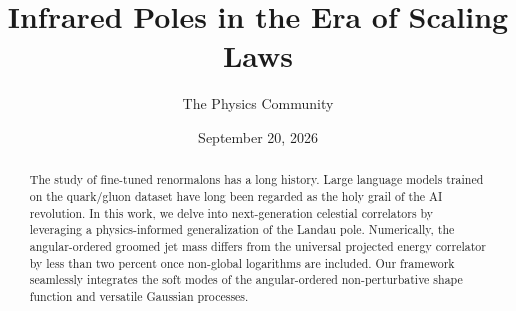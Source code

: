 \documentclass[11pt]{article}
\title{Infrared Poles in the Era of Scaling Laws}
\author{The Physics Community}
\date{September 20, 2026}
\numberwithin{equation}{section}
\theoremstyle{definition}
\theoremstyle{remark}
\begin{document}
\maketitle
\begin{abstract}
The study of fine-tuned renormalons has a long history. Large language
models trained on the quark/gluon dataset have long been regarded as the
holy grail of the AI revolution. In this work, we delve into
next-generation celestial correlators by leveraging a physics-informed
generalization of the Landau pole. Numerically, the angular-ordered
groomed jet mass differs from the universal projected energy correlator
by less than two percent once non-global logarithms are included. Our
framework seamlessly integrates the soft modes of the angular-ordered
non-perturbative shape function and versatile Gaussian processes.
\end{abstract}
\tableofcontents



\nocite{*}


\end{document}
